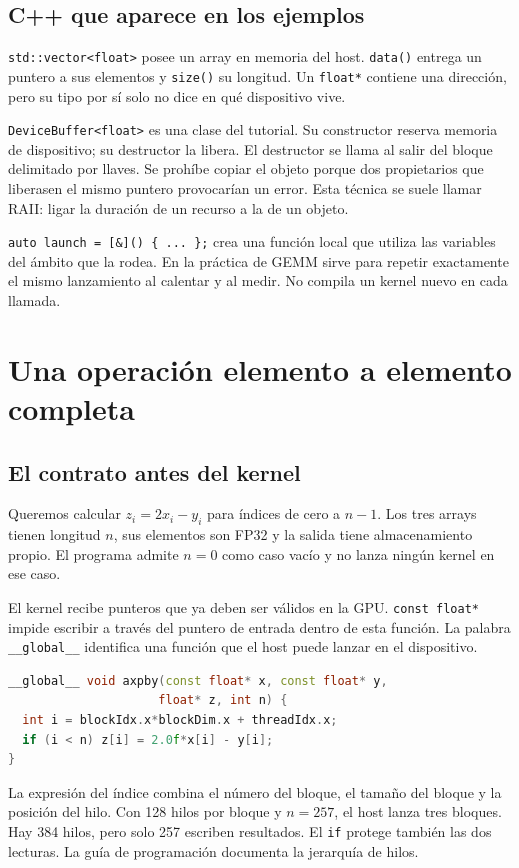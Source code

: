 \documentclass[12pt,a4paper,oneside]{report}
\begin{document}
\section{C++ que aparece en los ejemplos}
\texttt{std::vector<float>} posee un array en memoria del host. \texttt{data()} entrega un puntero a sus elementos y \texttt{size()} su longitud. Un \texttt{float*} contiene una dirección, pero su tipo por sí solo no dice en qué dispositivo vive.

\texttt{DeviceBuffer<float>} es una clase del tutorial. Su constructor reserva memoria de dispositivo; su destructor la libera. El destructor se llama al salir del bloque delimitado por llaves. Se prohíbe copiar el objeto porque dos propietarios que liberasen el mismo puntero provocarían un error. Esta técnica se suele llamar RAII: ligar la duración de un recurso a la de un objeto.

\texttt{auto launch \allowbreak{}= [\&]() \{ ..\allowbreak{}. \};} crea una función local que utiliza las variables del ámbito que la rodea. En la práctica de GEMM sirve para repetir exactamente el mismo lanzamiento al calentar y al medir. No compila un kernel nuevo en cada llamada.

\chapter{Una operación elemento a elemento completa}
\section{El contrato antes del kernel}
Queremos calcular $z_i=2x_i-y_i$ para índices de cero a $n-1$. Los tres arrays tienen longitud $n$, sus elementos son FP32 y la salida tiene almacenamiento propio. El programa admite $n=0$ como caso vacío y no lanza ningún kernel en ese caso.

El kernel recibe punteros que ya deben ser válidos en la GPU. \texttt{const float*} impide escribir a través del puntero de entrada dentro de esta función. La palabra \texttt{\_\_global\_\_} identifica una función que el host puede lanzar en el dispositivo.

\begin{lstlisting}[language=C++]
__global__ void axpby(const float* x, const float* y,
                     float* z, int n) {
  int i = blockIdx.x*blockDim.x + threadIdx.x;
  if (i < n) z[i] = 2.0f*x[i] - y[i];
}
\end{lstlisting}
La expresión del índice combina el número del bloque, el tamaño del bloque y la posición del hilo. Con 128 hilos por bloque y $n=257$, el host lanza tres bloques. Hay 384 hilos, pero solo 257 escriben resultados. El \texttt{if} protege también las dos lecturas. La guía de programación documenta la jerarquía de hilos. \cite{cuda-guide}
\end{document}
